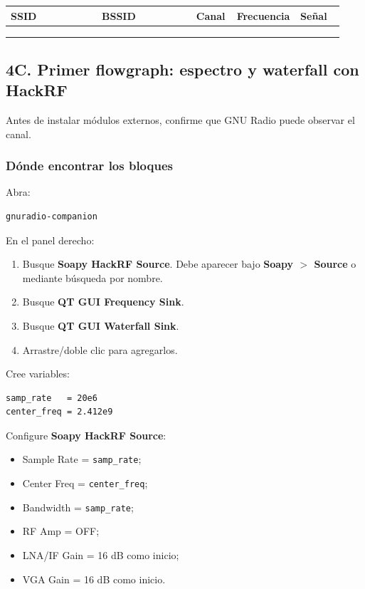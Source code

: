 \begin{longtable}{@{}p{0.27\linewidth}p{0.28\linewidth}p{0.12\linewidth}p{0.13\linewidth}p{0.13\linewidth}@{}}
\toprule
SSID & BSSID & Canal & Frecuencia & Señal \\
\midrule
\endhead
 & & & & \\
 & & & & \\
 & & & & \\
\bottomrule
\end{longtable}

\subsection{4C. Primer flowgraph: espectro y waterfall con HackRF}

Antes de instalar módulos externos, confirme que GNU Radio puede observar el canal.

\subsubsection{Dónde encontrar los bloques}

Abra:

\begin{lstlisting}
gnuradio-companion
\end{lstlisting}

En el panel derecho:

\begin{enumerate}
    \item Busque \textbf{Soapy HackRF Source}. Debe aparecer bajo \textbf{Soapy $>$ Source} o mediante búsqueda por nombre.
    \item Busque \textbf{QT GUI Frequency Sink}.
    \item Busque \textbf{QT GUI Waterfall Sink}.
    \item Arrastre/doble clic para agregarlos.
\end{enumerate}

Cree variables:

\begin{lstlisting}
samp_rate   = 20e6
center_freq = 2.412e9
\end{lstlisting}

Configure \textbf{Soapy HackRF Source}:

\begin{itemize}
    \item Sample Rate = \texttt{samp\_rate};
    \item Center Freq = \texttt{center\_freq};
    \item Bandwidth = \texttt{samp\_rate};
    \item RF Amp = OFF;
    \item LNA/IF Gain = 16 dB como inicio;
    \item VGA Gain = 16 dB como inicio.
\end{itemize}

